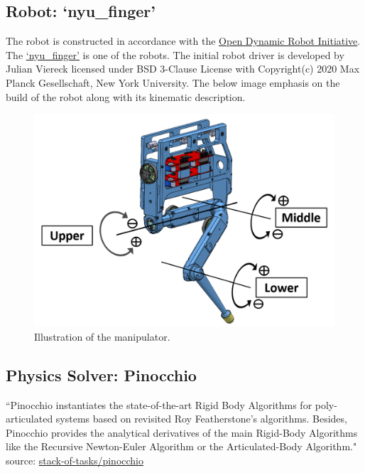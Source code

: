 \documentclass[12pt]{article}
\begin{document}
    \subsection{Robot: `nyu\_finger'}
        The robot is constructed in accordance with the \href{https://github.com/open-dynamic-robot-initiative}{Open Dynamic Robot Initiative}.
        The \href{https://github.com/open-dynamic-robot-initiative/nyu_finger}{`nyu\_finger'} is one of the robots.
        The initial robot driver \cite{robot_drivers} is developed by Julian Viereck licensed under BSD 3-Clause License with Copyright(c) 2020 Max Planck Gesellschaft, New York University.
        The below image emphasis on the build of the robot along with its kinematic description.
        \begin{figure}[h]
            \centering
            \includegraphics[scale=0.5]{finger_edu_joint_labels_1.png}
            \caption{Illustration of the manipulator.}
        \end{figure}

    \subsection{Physics Solver: Pinocchio}
        ``Pinocchio instantiates the state-of-the-art Rigid Body Algorithms for poly-articulated systems based on revisited Roy Featherstone's algorithms. 
        Besides, Pinocchio provides the analytical derivatives of the main Rigid-Body Algorithms like the Recursive Newton-Euler Algorithm or the Articulated-Body Algorithm."\\
        source: \href{https://github.com/stack-of-tasks/pinocchio}{stack-of-tasks/pinocchio} \cite{pinocchio}\\
\end{document}
